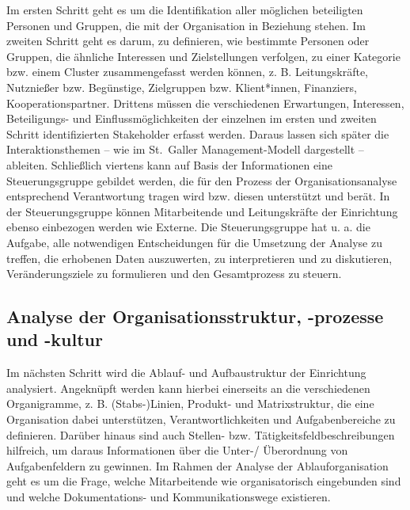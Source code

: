 \documentclass[
  letterpaper,
]{book}
\begin{document}
Im ersten Schritt geht es um die Identifikation aller möglichen
beteiligten Personen und Gruppen, die mit der Organisation in Beziehung
stehen. Im zweiten Schritt geht es darum, zu definieren, wie bestimmte
Personen oder Gruppen, die ähnliche Interessen und Zielstellungen
verfolgen, zu einer Kategorie bzw. einem Cluster zusammengefasst werden
können, z. B. Leitungskräfte, Nutznießer bzw. Begünstige, Zielgruppen
bzw. Klient*innen, Finanziers, Kooperationspartner. Drittens müssen die
verschiedenen Erwartungen, Interessen, Beteiligungs- und
Einflussmöglichkeiten der einzelnen im ersten und zweiten Schritt
identifizierten Stakeholder erfasst werden. Daraus lassen sich später
die Interaktionsthemen -- wie im St.~Galler Management-Modell
dargestellt -- ableiten. Schließlich viertens kann auf Basis der
Informationen eine Steuerungsgruppe gebildet werden, die für den Prozess
der Organisationsanalyse entsprechend Verantwortung tragen wird bzw.
diesen unterstützt und berät. In der Steuerungsgruppe können
Mitarbeitende und Leitungskräfte der Einrichtung ebenso einbezogen
werden wie Externe. Die Steuerungsgruppe hat u. a. die Aufgabe, alle
notwendigen Entscheidungen für die Umsetzung der Analyse zu treffen, die
erhobenen Daten auszuwerten, zu interpretieren und zu diskutieren,
Veränderungsziele zu formulieren und den Gesamtprozess zu steuern.

\subsection{Analyse der Organisationsstruktur, -prozesse und
-kultur}\label{analyse-der-organisationsstruktur--prozesse-und--kultur}

Im nächsten Schritt wird die Ablauf- und Aufbaustruktur der Einrichtung
analysiert. Angeknüpft werden kann hierbei einerseits an die
verschiedenen Organigramme, z. B. (Stabs-)Linien, Produkt- und
Matrixstruktur, die eine Organisation dabei unterstützen,
Verantwortlichkeiten und Aufgabenbereiche zu definieren. Darüber hinaus
sind auch Stellen- bzw. Tätigkeitsfeldbeschreibungen hilfreich, um
daraus Informationen über die Unter-/ Überordnung von Aufgabenfeldern zu
gewinnen. Im Rahmen der Analyse der Ablauforganisation geht es um die
Frage, welche Mitarbeitende wie organisatorisch eingebunden sind und
welche Dokumentations- und Kommunikationswege existieren.
\end{document}
